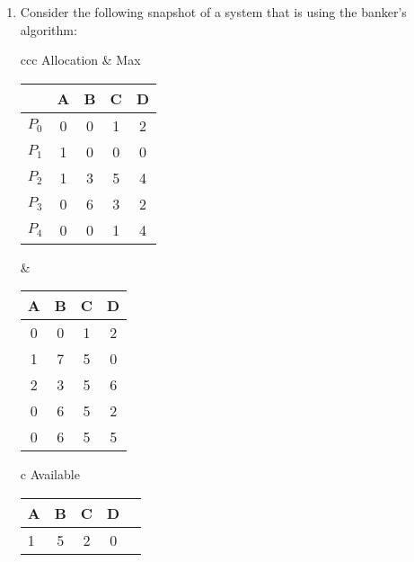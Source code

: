 \documentclass{article}
\newcommand{\answercolor}{Bittersweet}
\newcommand{\answer}[1]{{\\\color{\answercolor}\footnotesize\itshape{#1}}}
\newcommand{\answerimg}[1]{\answer{\begin{figure*}[h]\centering\texttt{[image: \#1]}\end{figure*}}}
\begin{document}
\begin{enumerate}
		\begin{enumerate}
			\item Draw resource-allocation graph for the system
			\answerimg{T5Q5a.jpg}
			\item Draw the corresponding wait-for graph
			\answerimg{T5Q5b.jpg}
			\item Is this system deadlocked?
			\answer{Yes, the system is deadlocked.}
			\item If so, which processes are involved?
			\answer{The processes involved are \textit{D,E,G}}
		\end{enumerate}
		\item Consider the following snapshot of a system that is using the banker’s algorithm:
		\begin{table*}[h]
			\centering
			\begin{tabular}{ccc}
				Allocation & Max \\
				\begin{tabular}{lcccc}
					& A & B & C & D \\\hline
					$P_0$ & 0 & 0 & 1 & 2 \\
					$P_1$ & 1 & 0 & 0 & 0 \\
					$P_2$ & 1 & 3 & 5 & 4 \\
					$P_3$ & 0 & 6 & 3 & 2 \\
					$P_4$ & 0 & 0 & 1 & 4 \\
				\end{tabular}
				&
				\begin{tabular}{cccc}
					A & B & C & D \\\hline
					0 & 0 & 1 & 2 \\
					1 & 7 & 5 & 0 \\
					2 & 3 & 5 & 6 \\
					0 & 6 & 5 & 2 \\
					0 & 6 & 5 & 5 \\
				\end{tabular}
			\end{tabular}
		\end{table*}
		\begin{table*}[h]
			\centering
			\begin{tabular}{c}
				Available                     \\
				\begin{tabular}{lcccc}
					A & B & C & D \\\hline
					1 & 5 & 2 & 0 \\
				\end{tabular}
			\end{tabular}

\end{table*}
\end{enumerate}
\end{document}
